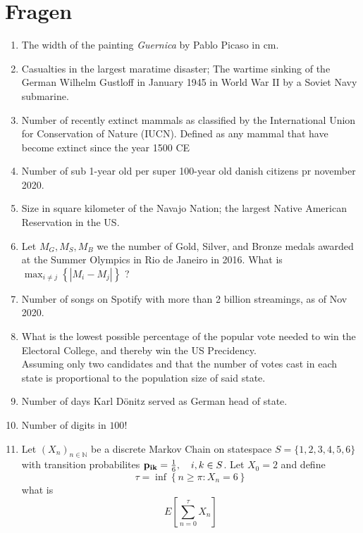 \documentclass[12pt,a4paper]{article}
\begin{document}
\section*{Fragen}
\begin{enumerate}

  \item The width of the painting \textit{Guernica} by Pablo Picaso in cm.

  \item Casualties in the largest maratime disaster; The wartime sinking of the German Wilhelm Gustloff in January 1945 in World War II by a Soviet Navy submarine.

  \item Number of recently extinct mammals as classified by the International Union for Conservation of Nature (IUCN). Defined as any mammal that have become extinct since the year 1500 CE

  \item Number of sub 1-year old per super 100-year old danish citizens pr november 2020.
  
  \item Size in square kilometer of the Navajo Nation; the largest Native American Reservation in the US.
  
  \item Let $M_G, M_S, M_B$ we the number of Gold, Silver, and Bronze medals awarded at the Summer Olympics in Rio de Janeiro in 2016. What is $\max_{i \neq j} \left\{ |M_i - M_j| \right\}$ ?
  
  \item Number of songs on Spotify with more than 2 billion streamings, as of Nov 2020.
  
  \item What is the lowest possible percentage of the popular vote needed to win the Electoral College, and thereby win the US Precidency.\\   Assuming only two candidates and that the number of votes cast in each state is proportional to the population size of said state.
  
  \item Number of days Karl Dönitz served as German head of state.
  
  \item Number of digits in $100!$
  
  \item Let $(X_n)_{n \in \mathbb{N}}$ be a discrete Markov Chain on statespace $S = \{1,2,3,4,5,6\}$ 
  with transition probabilites $\bold{p_{ik}} = \frac{1}{6}, \quad i,k \in S$.
  Let $X_0 = 2$ and define 
  $$\tau = \inf\left\{ n \geq \pi : X_n = 6 \right\}$$
  what is 
  $$ E \left[ \sum_{n = 0}^{\tau}X_n \right] $$
  
  
  
 

\end{enumerate}
\end{document}
